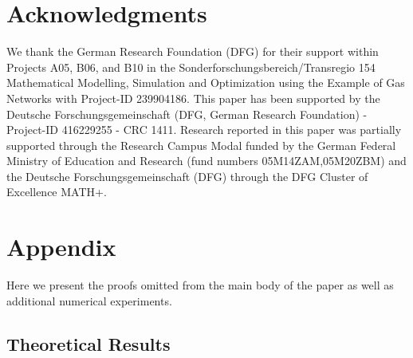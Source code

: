 \documentclass{article}
\begin{document}
\section*{Acknowledgments}
We thank the German Research Foundation (DFG) for their support within Projects A05, B06, and B10 in the Sonderforschungsbereich/Transregio 154 Mathematical Modelling, Simulation and Optimization using the Example of Gas Networks with Project-ID 239904186.
This paper has been supported by the Deutsche Forschungsgemeinschaft (DFG, German Research Foundation) - Project-ID 416229255 - CRC 1411. 
Research reported in this paper was partially supported through the Research Campus Modal funded by the German Federal Ministry of Education and Research (fund numbers 05M14ZAM,05M20ZBM) and the Deutsche Forschungsgemeinschaft (DFG) through the DFG Cluster of Excellence MATH+.



\newpage
\section*{Appendix}
\renewcommand\thetheorem{\Alph{section}.\arabic{theorem}}
Here we present the proofs omitted from the main body of the paper as well as additional numerical experiments.



\subsection*{Theoretical Results}
\end{document}
